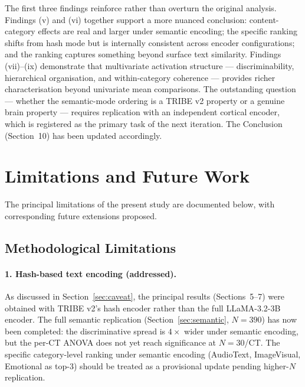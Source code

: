 \documentclass[11pt,letterpaper]{article}
\numberwithin{equation}{section}
\begin{document}
The first three findings reinforce rather than overturn the original analysis. Findings (v) and (vi) together support a more nuanced conclusion: content-category effects are real and larger under semantic encoding; the specific ranking shifts from hash mode but is internally consistent across encoder configurations; and the ranking captures something beyond surface text similarity. Findings (vii)--(ix) demonstrate that multivariate activation structure --- discriminability, hierarchical organisation, and within-category coherence --- provides richer characterisation beyond univariate mean comparisons. The outstanding question --- whether the semantic-mode ordering is a TRIBE v2 property or a genuine brain property --- requires replication with an independent cortical encoder, which is registered as the primary task of the next iteration. The Conclusion (Section~10) has been updated accordingly.

\FloatBarrier
\clearpage
\section{Limitations and Future Work}

The principal limitations of the present study are documented below, with corresponding future extensions proposed.

\subsection{Methodological Limitations}

\paragraph{1. Hash-based text encoding (addressed).} As discussed in Section~\ref{sec:caveat}, the principal results (Sections~5--7) were obtained with TRIBE v2's hash encoder rather than the full LLaMA-3.2-3B encoder. The full semantic replication (Section~\ref{sec:semantic}, $N=390$) has now been completed: the discriminative spread is $4\times$ wider under semantic encoding, but the per-CT ANOVA does not yet reach significance at $N=30$/CT. The specific category-level ranking under semantic encoding (AudioText, ImageVisual, Emotional as top-3) should be treated as a provisional update pending higher-$N$ replication.
\end{document}
